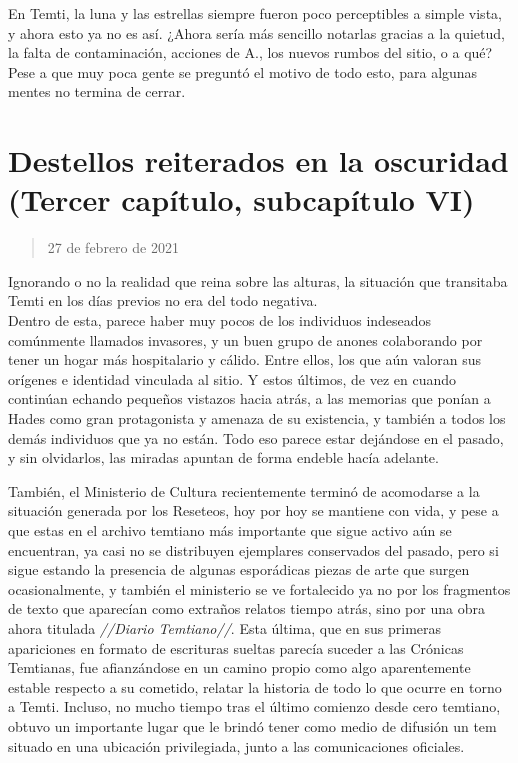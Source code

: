 \documentclass[
  spanish,
]{book}
\begin{document}
En Temti, la luna y las estrellas siempre fueron poco perceptibles a simple vista, y ahora esto ya no es así. ¿Ahora sería más sencillo notarlas gracias a la quietud, la falta de contaminación, acciones de A., los nuevos rumbos del sitio, o a qué?\\
Pese a que muy poca gente se preguntó el motivo de todo esto, para algunas mentes no termina de cerrar.

\hypertarget{destellos-reiterados-en-la-oscuridad-tercer-capuxedtulo-subcapuxedtulo-vi}{%
\section{Destellos reiterados en la oscuridad (Tercer capítulo, subcapítulo VI)}\label{destellos-reiterados-en-la-oscuridad-tercer-capuxedtulo-subcapuxedtulo-vi}}

\begin{quote}
27 de febrero de 2021
\end{quote}

Ignorando o no la realidad que reina sobre las alturas, la situación que transitaba Temti en los días previos no era del todo negativa.\\
Dentro de esta, parece haber muy pocos de los individuos indeseados comúnmente llamados invasores, y un buen grupo de anones colaborando por tener un hogar más hospitalario y cálido. Entre ellos, los que aún valoran sus orígenes e identidad vinculada al sitio. Y estos últimos, de vez en cuando continúan echando pequeños vistazos hacia atrás, a las memorias que ponían a Hades como gran protagonista y amenaza de su existencia, y también a todos los demás individuos que ya no están. Todo eso parece estar dejándose en el pasado, y sin olvidarlos, las miradas apuntan de forma endeble hacía adelante.

También, el Ministerio de Cultura recientemente terminó de acomodarse a la situación generada por los Reseteos, hoy por hoy se mantiene con vida, y pese a que estas en el archivo temtiano más importante que sigue activo aún se encuentran, ya casi no se distribuyen ejemplares conservados del pasado, pero si sigue estando la presencia de algunas esporádicas piezas de arte que surgen ocasionalmente, y también el ministerio se ve fortalecido ya no por los fragmentos de texto que aparecían como extraños relatos tiempo atrás, sino por una obra ahora titulada \emph{//Diario Temtiano//}. Esta última, que en sus primeras apariciones en formato de escrituras sueltas parecía suceder a las Crónicas Temtianas, fue afianzándose en un camino propio como algo aparentemente estable respecto a su cometido, relatar la historia de todo lo que ocurre en torno a Temti. Incluso, no mucho tiempo tras el último comienzo desde cero temtiano, obtuvo un importante lugar que le brindó tener como medio de difusión un tem situado en una ubicación privilegiada, junto a las comunicaciones oficiales.
\end{document}

